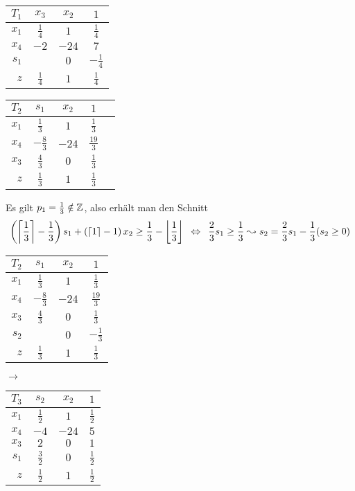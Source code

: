 \begin{beispiel}
	\begin{center}
		\begin{tabular}{r|cc|c}
			$T_1$ & $x_3$ & $x_2$ & $1$ \\ \hline
			$x_1$ & $\frac{1}{4}$ & $1$ & $\frac{1}{4}$ \\
			$x_4$ & $-2$ & $-24$ & $7$ \\
			$s_1$ & \fbox{$\frac{3}{4}$} & $0$ & $-\frac{1}{4}$ \\ \hline
			$z$ & $\frac{1}{4}$ & $1$ & $\frac{1}{4}$ \\
		\end{tabular}
		\begin{tabular}{r|cc|cr}
			$T_2$ & $s_1$ & $x_2$ & $1$ \\ \hline
			$x_1$ & $\frac{1}{3}$ & $1$ & $\frac{1}{3}$ \\
			$x_4$ & $-\frac{8}{3}$ & $-24$ & $\frac{19}{3}$ \\
			$x_3$ & $\frac{4}{3}$ & $0$ & $\frac{1}{3}$ & \phantom{\fbox{$\frac{3}{4}$}} \\ \hline
			$z$ & $\frac{1}{3}$ & $1$ & $\frac{1}{3}$ \\
		\end{tabular}
	\end{center}

	Es gilt $p_1 = \frac{1}{3} \notin \mathbb{Z}$, also erhält man den Schnitt
	\begin{equation*}
		\left( \left\lceil \frac{1}{3} \right\rceil - \frac{1}{3} \right) s_1 + \left( \left\lceil 1 \right\rceil - 1 \right) x_2 \ge \frac{1}{3} - \left\lfloor \frac{1}{3} \right\rfloor \enskip \Leftrightarrow \enskip \frac{2}{3} s_1 \ge \frac{1}{3} \leadsto s_2 = \frac{2}{3} s_1 - \frac{1}{3} (s_2 \ge 0)
	\end{equation*}
	
	\begin{center}
		\begin{tabular}{r|cc|c}
			$T_2$ & $s_1$ & $x_2$ & $1$ \\ \hline
			$x_1$ & $\frac{1}{3}$ & $1$ & $\frac{1}{3}$ \\
			$x_4$ & $-\frac{8}{3}$ & $-24$ & $\frac{19}{3}$ \\
			$x_3$ & $\frac{4}{3}$ & $0$ & $\frac{1}{3}$ \\
			$s_2$ & \fbox{$\frac{2}{3}$} & $0$ & $-\frac{1}{3}$ \\ \hline
			$z$ & $\frac{1}{3}$ & $1$ & $\frac{1}{3}$ \\
		\end{tabular}
		$\longrightarrow$
		\begin{tabular}{r|cc|c}
			$T_3$ & $s_2$ & $x_2$ & $1$ \\ \hline
			$x_1$ & $\frac{1}{2}$ & $1$ & $\frac{1}{2}$ \\
			$x_4$ & $-4$ & $-24$ & $5$ \\
			$x_3$ & $2$ & $0$ & $1$ \\
			$s_1$ & $\frac{3}{2}$ & $0$ & $\frac{1}{2}$ \\ \hline
			$z$ & $\frac{1}{2}$ & $1$ & $\frac{1}{2}$ \\
		\end{tabular}
	\end{center}


\end{beispiel}
